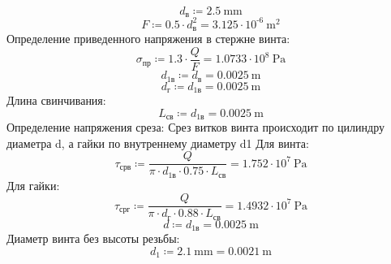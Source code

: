\documentclass{article}
\newcommand{\defeq}{\coloneq} %
\begin{document}
\begin{equation*}
d_{в} \defeq 2.5 \: \mathrm{mm}
\end{equation*}
\begin{equation*}
F \defeq 0.5 \cdot d_{в}^{2} = {3.125 \cdot 10^{ \operatorname{-} 6} \: \mathrm{m}^{2}}
\end{equation*}
\colorbox[HTML]{000000}{Определение приведенного напряжения в стержне винта:}\newline
\begin{equation*}
σ_{пр} \defeq 1.3 \cdot \frac{Q}{F} = {1.0733 \cdot 10^{8} \: \mathrm{Pa}}
\end{equation*}
\begin{equation*}
\textit{d}_{\textit{1в}} \defeq d_{в} = {0.0025 \: \mathrm{m}}
\end{equation*}
\begin{equation*}
d_{г} \defeq \textit{d}_{\textit{1в}} = {0.0025 \: \mathrm{m}}
\end{equation*}
\colorbox[HTML]{000000}{Длина свинчивания:}\newline
\begin{equation*}
L_{св} \defeq \textit{d}_{\textit{1в}} = {0.0025 \: \mathrm{m}}
\end{equation*}
\colorbox[HTML]{000000}{Определение напряжения среза:}\newline
\colorbox[HTML]{000000}{Срез витков винта происходит по цилиндру диаметра d, а гайки по внутреннему диаметру d1}\newline
\colorbox[HTML]{000000}{Для винта:}\newline
\begin{equation*}
τ_{срв} \defeq \frac{Q}{{\pi} \cdot \textit{d}_{\textit{1в}} \cdot 0.75 \cdot L_{св}} = {1.752 \cdot 10^{7} \: \mathrm{Pa}}
\end{equation*}
\colorbox[HTML]{000000}{Для гайки:}\newline
\begin{equation*}
τ_{срг} \defeq \frac{Q}{{\pi} \cdot d_{г} \cdot 0.88 \cdot L_{св}} = {1.4932 \cdot 10^{7} \: \mathrm{Pa}}
\end{equation*}
\begin{equation*}
d \defeq \textit{d}_{\textit{1в}} = {0.0025 \: \mathrm{m}}
\end{equation*}
\colorbox[HTML]{000000}{Диаметр винта без высоты резьбы:}\newline
\begin{equation*}
\textit{d}_{\textit{1}} \defeq 2.1 \: \mathrm{mm} = {0.0021 \: \mathrm{m}}
\end{equation*}
\end{document}
